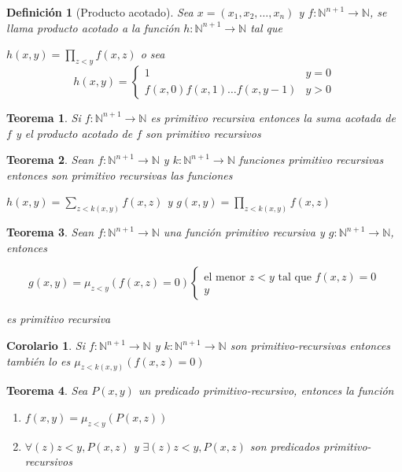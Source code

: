 \documentclass[a4paper,1pt]{report}
\newtheorem*{teo}{Teorema}
\newtheorem*{cor}{Corolario}
\newtheorem*{dfn}{Definición}
\begin{document}
\begin{dfn}[Producto acotado]
 Sea $x=(x_1,x_2,\dots,x_n)$ y $f:\mathbb{N}^{n+1}\rightarrow\mathbb{N}$, se llama producto acotado a la función $h:\mathbb{N}^{n+1}\rightarrow\mathbb{N}$ tal que 
 
 $h(x,y)=\prod_{z<y}f(x,z)$ o sea
 \begin{equation}
h(x,y) = 
\begin{cases}
1 & y=0 \\
f(x,0)f(x,1)\dots f(x,y-1) & y>0 
\end{cases}
\end{equation}
\end{dfn}

\begin{teo}
 Si $f:\mathbb{N}^{n+1}\rightarrow\mathbb{N}$ es primitivo recursiva entonces la suma acotada de $f$ y el producto acotado de $f$ son primitivo recursivos
\end{teo}

\begin{teo}
 Sean $f:\mathbb{N}^{n+1}\rightarrow\mathbb{N}$ y $k:\mathbb{N}^{n+1}\rightarrow\mathbb{N}$ funciones primitivo recursivas entonces son primitivo recursivas las funciones 
 
 $h(x,y) = \sum_{z<k(x,y)}f(x,z)$ y $g(x,y) = \prod_{z<k(x,y)}f(x,z)$
\end{teo}

\begin{teo}
 Sean $f:\mathbb{N}^{n+1}\rightarrow\mathbb{N}$ una función primitivo recursiva y $g:\mathbb{N}^{n+1}\rightarrow\mathbb{N}$, entonces
 
 \begin{equation}
g(x,y) = \mu_{z<y}(f(x,z)=0) 
\begin{cases}
\text{el menor } z<y \text{ tal que }f(x,z)=0\\
y
\end{cases}
\end{equation}

es primitivo recursiva
 
\end{teo}


\begin{cor}
 Si  $f:\mathbb{N}^{n+1}\rightarrow\mathbb{N}$ y $k:\mathbb{N}^{n+1}\rightarrow\mathbb{N}$ son primitivo-recursivas entonces también lo es $\mu_{z<k(x,y)}(f(x,z)=0) $
\end{cor}

\begin{teo}
Sea $P(x,y)$ un predicado primitivo-recursivo, entonces la función 
\begin{enumerate}
 \item $f(x,y)=\mu_{z<y}(P(x,z))$
 \item $\forall(z) z<y, P(x,z)$ y $\exists(z)z<y, P(x,z)$ son predicados primitivo-recursivos
\end{enumerate}


\end{teo}

  
\end{document}
